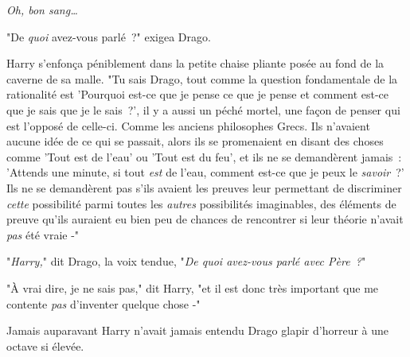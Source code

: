 \emph{Oh, bon sang…}

"De \emph{quoi} avez-vous parlé~?" exigea Drago.

Harry s'enfonça péniblement dans la petite chaise pliante posée au fond de la caverne de sa malle. "Tu sais Drago, tout comme la question fondamentale de la rationalité est 'Pourquoi est-ce que je pense ce que je pense et comment est-ce que je sais que je le sais~?', il y a aussi un péché mortel, une façon de penser qui est l'opposé de celle-ci. Comme les anciens philosophes Grecs. Ils n'avaient aucune idée de ce qui se passait, alors ils se promenaient en disant des choses comme 'Tout est de l'eau' ou 'Tout est du feu', et ils ne se demandèrent jamais~: 'Attends une minute, si tout \emph{est} de l'eau, comment est-ce que je peux le \emph{savoir}~?' Ils ne se demandèrent pas s'ils avaient les preuves leur permettant de discriminer \emph{cette} possibilité parmi toutes les \emph{autres} possibilités imaginables, des éléments de preuve qu'ils auraient eu bien peu de chances de rencontrer si leur théorie n'avait \emph{pas} été vraie -"

"\emph{Harry,}" dit Drago, la voix tendue, "\emph{De quoi avez-vous parlé avec Père~?}"

"À vrai dire, je ne sais pas," dit Harry, "et il est donc très important que me contente \emph{pas} d'inventer quelque chose -"

Jamais auparavant Harry n'avait jamais entendu Drago glapir d'horreur à une octave si élevée. 

